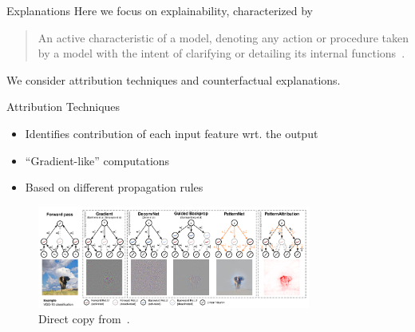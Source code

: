 \begin{frame}{Explanations}
	Here we focus on \alert{explainability}, characterized by
	\vspace{1em}

	\begin{quote}
		An active characteristic of a model, denoting any action or procedure taken by a model with the intent of clarifying or detailing its internal functions~\cite{Arrieta2019}.
	\end{quote}

	We consider \alert{attribution} techniques and \alert{counterfactual} explanations. 

\end{frame}

\begin{frame}{Attribution Techniques}
	\begin{itemize}
		\item Identifies contribution of each input feature wrt. the output
		\item ``Gradient-like'' computations
		\item Based on different propagation rules
	\end{itemize}
	
	\begin{figure}
		\centering
		\includegraphics[width=0.8\textwidth]{explanation_techniques}
		\caption{Direct copy from~\cite{patternnet}.}
	\end{figure}
\end{frame}

